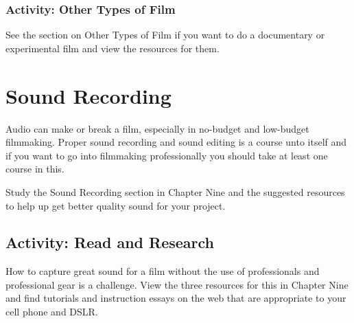 \documentclass[
  letterpaper,
  DIV=11,
  numbers=noendperiod]{scrreprt}
\begin{document}
\subsubsection{Activity: Other Types of
Film}\label{activity-other-types-of-film}

\begin{tcolorbox}[enhanced jigsaw, titlerule=0mm, leftrule=.75mm, bottomrule=.15mm, colback=white, left=2mm, opacitybacktitle=0.6, title={Learning Activity}, colbacktitle=quarto-callout-note-color!10!white, colframe=quarto-callout-note-color-frame, bottomtitle=1mm, toptitle=1mm, opacityback=0, rightrule=.15mm, breakable, arc=.35mm, toprule=.15mm, coltitle=black]

See the section on Other Types of Film if you want to do a documentary
or experimental film and view the resources for them.

\end{tcolorbox}

\section{Sound Recording}\label{sound-recording}

Audio can make or break a film, especially in no-budget and low-budget
filmmaking. Proper sound recording and sound editing is a course unto
itself and if you want to go into filmmaking professionally you should
take at least one course in this.

Study the Sound Recording section in Chapter Nine and the suggested
resources to help up get better quality sound for your project.

\subsection{Activity: Read and
Research}\label{activity-read-and-research}

\begin{tcolorbox}[enhanced jigsaw, titlerule=0mm, leftrule=.75mm, bottomrule=.15mm, colback=white, left=2mm, opacitybacktitle=0.6, title={Learning Activity}, colbacktitle=quarto-callout-note-color!10!white, colframe=quarto-callout-note-color-frame, bottomtitle=1mm, toptitle=1mm, opacityback=0, rightrule=.15mm, breakable, arc=.35mm, toprule=.15mm, coltitle=black]

How to capture great sound for a film without the use of professionals
and professional gear is a challenge. View the three resources for this
in Chapter Nine and find tutorials and instruction essays on the web
that are appropriate to your cell phone and DSLR.

\end{tcolorbox}
\end{document}
